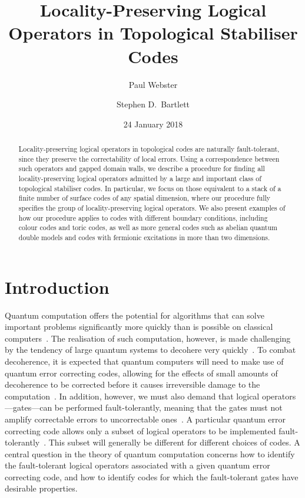 \documentclass[pra,twocolumn,a4paper,nofootinbib]{revtex4-1}
\begin{document}
\title{Locality-Preserving Logical Operators in Topological Stabiliser Codes}
\author{Paul Webster}
\author{Stephen D.~Bartlett}

\date{24 January 2018}

\begin{abstract}
Locality-preserving logical operators in topological codes are naturally fault-tolerant, since they preserve the correctability of local errors.  Using a correspondence between such operators and gapped domain walls, we describe a procedure for finding all locality-preserving logical operators admitted by a large and important class of topological stabiliser codes.  In particular, we focus on those equivalent to a stack of a finite number of surface codes of any spatial dimension, where our procedure fully specifies the group of locality-preserving logical operators.  We also present examples of how our procedure applies to codes with different boundary conditions, including colour codes and toric codes, as well as more general codes such as abelian quantum double models and codes with fermionic excitations in more than two dimensions.  
\end{abstract}

\maketitle
\section{Introduction}
Quantum computation offers the potential for algorithms that can solve important problems significantly more quickly than is possible on classical computers~\cite{Shor,Grover}. The realisation of such computation, however, is made challenging by the tendency of large quantum systems to decohere very quickly~\cite{Chuang}.  To combat decoherence, it is expected that quantum computers will need to make use of quantum error correcting codes, allowing for the effects of small amounts of decoherence to be corrected before it causes irreversible damage to the computation~\cite{Shor2}.  In addition, however, we must also demand that logical operators---gates---can be performed fault-tolerantly, meaning that the gates must not amplify correctable errors to uncorrectable ones~\cite{Preskill, NC,Gottesman2}. A particular quantum error correcting code allows only a subset of logical operators to be implemented fault-tolerantly~\cite{EastinKnill}.  This subset will generally be different for different choices of codes.  A central question in the theory of quantum computation concerns how to identify the fault-tolerant logical operators associated with a given quantum error correcting code, and how to identify codes for which the fault-tolerant gates have desirable properties.
\end{document}
